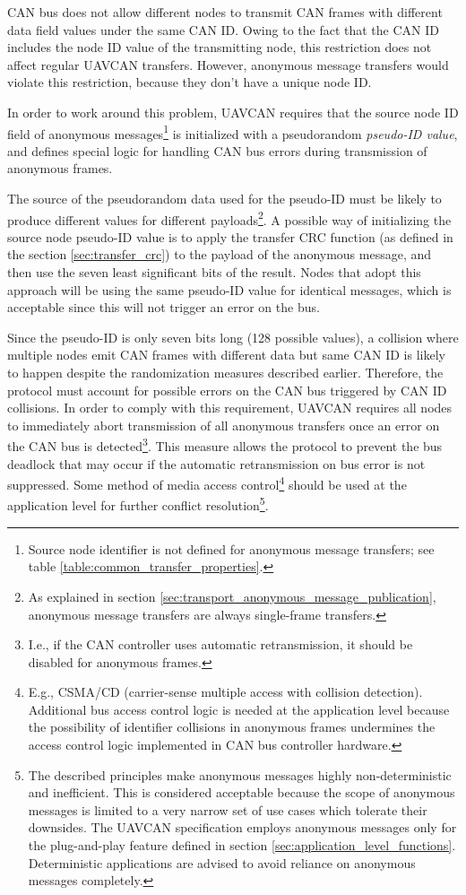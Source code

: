 CAN bus does not allow different nodes to transmit CAN frames with different data field values under the same CAN ID.
Owing to the fact that the CAN ID includes the node ID value of the transmitting node,
this restriction does not affect regular UAVCAN transfers.
However, anonymous message transfers would violate this restriction,
because they don't have a unique node ID.

In order to work around this problem,
UAVCAN requires that the source node ID field of anonymous messages\footnote{Source node identifier
is not defined for anonymous message transfers; see table \ref{table:common_transfer_properties}.}
is initialized with a pseudorandom \emph{pseudo-ID value},
and defines special logic for handling CAN bus errors during transmission of anonymous frames.

The source of the pseudorandom data used for the pseudo-ID must be likely to produce different values
for different payloads\footnote{As explained in section \ref{sec:transport_anonymous_message_publication},
anonymous message transfers are always single-frame transfers.}.
A possible way of initializing the source node pseudo-ID value is to apply the transfer CRC function
(as defined in the section \ref{sec:transfer_crc})
to the payload of the anonymous message, and then use the seven least significant bits of the result.
Nodes that adopt this approach will be using the same pseudo-ID value for identical messages,
which is acceptable since this will not trigger an error on the bus.

Since the pseudo-ID is only seven bits long (128 possible values),
a collision where multiple nodes emit CAN frames with different data but same CAN ID is likely to happen
despite the randomization measures described earlier.
Therefore, the protocol must account for possible errors on the CAN bus triggered by CAN ID collisions.
In order to comply with this requirement,
UAVCAN requires all nodes to immediately abort transmission of all anonymous transfers once an error on
the CAN bus is detected\footnote{I.e., if the CAN controller uses automatic retransmission,
it should be disabled for anonymous frames.}.
This measure allows the protocol to prevent the bus deadlock that may occur if the automatic
retransmission on bus error is not suppressed.
Some method of media access control\footnote{%
    E.g., CSMA/CD (carrier-sense multiple access with collision detection).
    Additional bus access control logic is needed at the application level because
    the possibility of identifier collisions in anonymous frames undermines the access control logic implemented
    in CAN bus controller hardware.
}
should be used at the application level for further conflict resolution\footnote{%
    The described principles make anonymous messages highly non-deterministic and inefficient.
    This is considered acceptable because the scope of anonymous messages is limited to a very narrow set of use
    cases which tolerate their downsides. The UAVCAN specification employs anonymous messages only for the
    plug-and-play feature defined in section \ref{sec:application_level_functions}.
    Deterministic applications are advised to avoid reliance on anonymous messages completely.
}.


